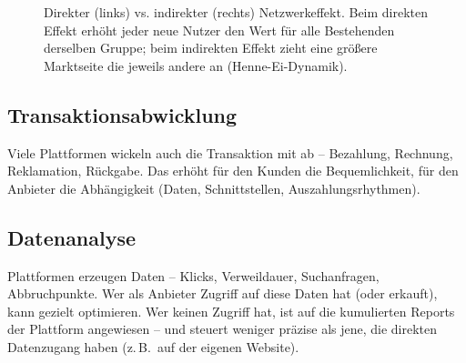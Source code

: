 \documentclass[11pt,a4paper,oneside]{article}
\begin{document}
\begin{figure}[h]
\caption{\sffamily Direkter (links) vs. indirekter (rechts) Netzwerkeffekt. Beim direkten Effekt erhöht jeder neue Nutzer den Wert für alle Bestehenden derselben Gruppe; beim indirekten Effekt zieht eine größere Marktseite die jeweils andere an (Henne-Ei-Dynamik).}
\label{fig:netzwerkeffekte-22t01}
\end{figure}

\subsection{Transaktionsabwicklung}

Viele Plattformen wickeln auch die Transaktion mit ab -- Bezahlung, Rechnung, Reklamation, Rückgabe. Das erhöht für den Kunden die Bequemlichkeit, für den Anbieter die Abhängigkeit (Daten, Schnittstellen, Auszahlungsrhythmen).

\subsection{Datenanalyse}

Plattformen erzeugen Daten -- Klicks, Verweildauer, Suchanfragen, Abbruchpunkte. Wer als Anbieter Zugriff auf diese Daten hat (oder erkauft), kann gezielt optimieren. Wer keinen Zugriff hat, ist auf die kumulierten Reports der Plattform angewiesen -- und steuert weniger präzise als jene, die direkten Datenzugang haben (z.\,B.\ auf der eigenen Website).
\end{document}

